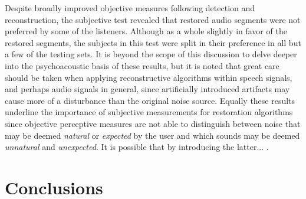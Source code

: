 Despite broadly improved objective measures following detection and reconstruction, the subjective test revealed that restored audio segments were not preferred by some of the listeners. Although as a whole slightly in favor of the restored segments, the subjects in this test were split in their preference in all but a few of the testing sets. It is beyond the scope of this discussion to delve deeper into the psychoacoustic basis of these results, but it is noted that great care should be taken when applying reconstructive algorithms within speech signals, and perhaps audio signals in general, since artificially introduced artifacts may cause more of a disturbance than the original noise source. Equally these results underline the importance of subjective measurements for restoration algorithms since objective perceptive measures are not able to distinguish between noise that may be deemed \emph{natural} or \emph{expected} by the user and which sounds may be deemed \emph{unnatural} and \emph{unexpected}. It is possible that by introducing the latter... .


\section{Conclusions}




